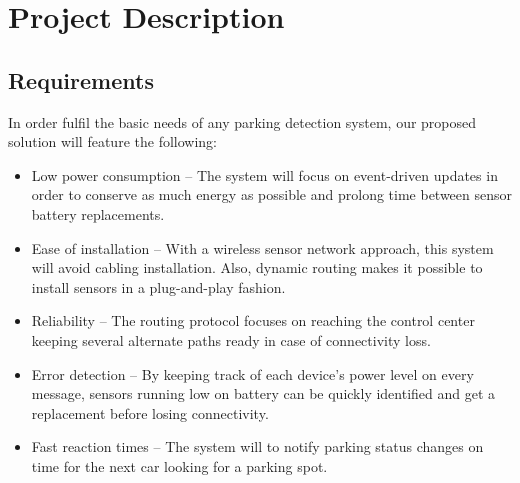 \chapter{Project Description}
\label{project_description}

\section{Requirements}
\noindent In order fulfil the basic needs of any parking detection system, our proposed solution will feature the following: 
\begin{itemize}[noitemsep]
	\item Low power consumption – The system will focus on event-driven updates in order to conserve as much energy as possible and prolong time between sensor battery replacements.
	\item Ease of installation – With a wireless sensor network approach, this system will avoid cabling installation. Also, dynamic routing makes it possible to install sensors in a plug-and-play fashion.
	\item Reliability – The routing protocol focuses on reaching the control center keeping several alternate paths ready in case of connectivity loss.
	\item Error detection – By keeping track of each device's power level on every message, sensors running low on battery can be quickly identified and get a replacement before losing connectivity.
	\item Fast reaction times – The system will to notify parking status changes on time for the next car looking for a parking spot.
\end{itemize}

